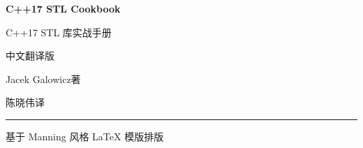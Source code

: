 \thispagestyle{empty}
\begingroup
\centering
\vspace*{1.6cm}
{\sffamily\fontsize{34bp}{40bp}\selectfont\bfseries\color{chapterblue} C++17 STL Cookbook\par}
\vspace{10bp}
{\fontsize{16bp}{22bp}\selectfont C++17 STL 库实战手册\par}
\vspace{2bp}
{\fontsize{12bp}{17bp}\selectfont 中文翻译版\par}

\vspace{36bp}
{\fontsize{14bp}{20bp}\selectfont Jacek Galowicz\quad 著\par}
\vspace{6bp}
{\fontsize{14bp}{20bp}\selectfont 陈晓伟\quad 译\par}

\vfill
{%
  \color{chapterblue}\rule{0.62\textwidth}{1.4bp}\par
}
\vspace{10bp}
{\fontsize{11bp}{15bp}\selectfont 基于 Manning 风格 \LaTeX{} 模版排版\par}
\endgroup
